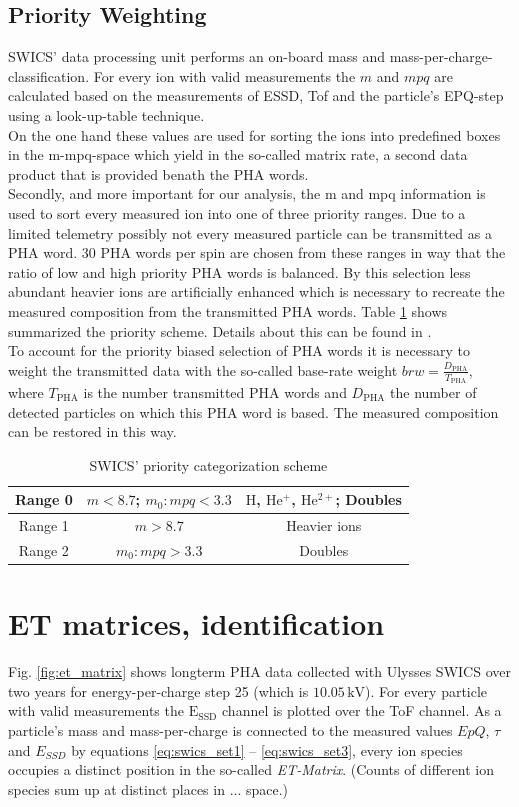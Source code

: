 \subsection{Priority Weighting}
\label{subsec:prio}
SWICS' data processing unit performs an on-board mass and mass-per-charge-classification. For every ion with valid measurements the $m$ and $mpq$ are calculated based on the measurements of ESSD, Tof and the particle's EPQ-step using a look-up-table technique.\\
On the one hand these values are used for sorting the ions into predefined boxes in the m-mpq-space which yield in the so-called matrix rate, a second data product that is provided benath the PHA words.\\
Secondly, and more important for our analysis, the m and mpq information is used to sort every measured ion into one of three priority ranges. Due to a limited telemetry possibly not every measured particle can be transmitted as a PHA word. 
30 PHA words per spin are chosen from these ranges in way that the ratio of low and high priority PHA words is balanced. By this selection less abundant heavier ions are artificially enhanced which is necessary to recreate the measured composition from the transmitted PHA words. Table \ref{tab} shows summarized the priority scheme. Details about this can be found in \citet{gloeckler_1992}.\\
To account for the priority biased selection of PHA words it is necessary to weight the transmitted data with the so-called base-rate weight $brw = \frac{D_{\mathrm{PHA}}}{T_{\mathrm{PHA}}}$, where $T_{\mathrm{PHA}}$ is the number transmitted PHA words and $D_{\mathrm{PHA}}$ the number of detected particles on which this PHA word is based. The measured composition can be restored in this way.
\begin{table}[h]
	\caption{SWICS' priority categorization scheme} 
	\centering
	\begin{tabular}{c|c|c}
		Range 0 & $m < 8.7$;  $m_0 : mpq < 3.3$ & $\mathrm{H}$, $\mathrm{He^+}$, $\mathrm{He^{2+}}$; Doubles\\ 
		\hline 
		Range 1 & $m > 8.7$ & Heavier ions \\ 
		\hline 
		Range 2 & $m_0 : mpq > 3.3$ & Doubles \\ 
	\end{tabular} 
	\label{tab}
\end{table}
%
%
%
\section{ET matrices, identification}
\label{sec:etmatrices}
Fig. \ref{fig:et_matrix} shows longterm PHA data collected with Ulysses SWICS over two years for energy-per-charge step 25 (which is $10.05\,\mathrm{kV}$). For every particle with valid measurements the $\mathrm{E_{SSD}}$ channel is plotted over the ToF channel. As a particle's mass and mass-per-charge is connected to the measured values $EpQ$, $\tau$ and $E_{SSD}$ by equations \ref{eq:swics_set1} --  \ref{eq:swics_set3}, every ion species occupies a distinct position in the so-called \textit{ET-Matrix}. (Counts of different ion species sum up at distinct places in ... space.)


